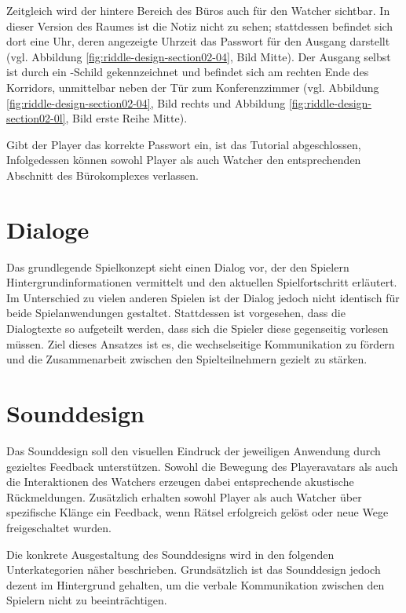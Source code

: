 Zeitgleich wird der hintere Bereich des Büros auch für den Watcher sichtbar. In dieser Version des Raumes ist die Notiz nicht zu sehen; stattdessen befindet sich dort eine Uhr, deren angezeigte Uhrzeit das Passwort für den Ausgang darstellt (vgl. Abbildung \ref{fig:riddle-design-section02-04}, Bild Mitte). Der Ausgang selbst ist durch ein -Schild gekennzeichnet und befindet sich am rechten Ende des Korridors, unmittelbar neben der Tür zum Konferenzzimmer (vgl. Abbildung \ref{fig:riddle-design-section02-04}, Bild rechts und Abbildung \ref{fig:riddle-design-section02-0l}, Bild erste Reihe Mitte).

Gibt der Player das korrekte Passwort ein, ist das Tutorial abgeschlossen, Infolgedessen können sowohl Player als auch Watcher den entsprechenden Abschnitt des Bürokomplexes verlassen.

\section{Dialoge}

Das grundlegende Spielkonzept sieht einen Dialog vor, der den Spielern Hintergrundinformationen vermittelt und den aktuellen Spielfortschritt erläutert. Im Unterschied zu vielen anderen Spielen ist der Dialog jedoch nicht identisch für beide Spielanwendungen gestaltet. Stattdessen ist vorgesehen, dass die Dialogtexte so aufgeteilt werden, dass sich die Spieler diese gegenseitig vorlesen müssen. Ziel dieses Ansatzes ist es, die wechselseitige Kommunikation zu fördern und die Zusammenarbeit zwischen den Spielteilnehmern gezielt zu stärken.

\section{Sounddesign}

Das Sounddesign soll den visuellen Eindruck der jeweiligen Anwendung durch gezieltes Feedback unterstützen. Sowohl die Bewegung des Playeravatars als auch die Interaktionen des Watchers erzeugen dabei entsprechende akustische Rückmeldungen. Zusätzlich erhalten sowohl Player als auch Watcher über spezifische Klänge ein Feedback, wenn Rätsel erfolgreich gelöst oder neue Wege freigeschaltet wurden.

Die konkrete Ausgestaltung des Sounddesigns wird in den folgenden Unterkategorien näher beschrieben. Grundsätzlich ist das Sounddesign jedoch dezent im Hintergrund gehalten, um die verbale Kommunikation zwischen den Spielern nicht zu beeinträchtigen.

